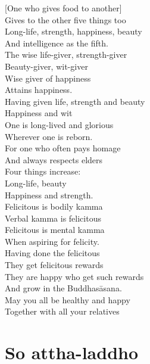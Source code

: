 \begin{english}
[One who gives food to another]\\
Gives to the other five things too\\
Long-life, strength, happiness, beauty\\
And intelligence as the fifth.\\
The wise life-giver, strength-giver\\
Beauty-giver, wit-giver\\
Wise giver of happiness\\
Attains happiness.\\
Having given life, strength and beauty\\
Happiness and wit\\
One is long-lived and glorious\\
Wherever one is reborn.\\
For one who often pays homage\\
And always respects elders\\
Four things increase:\\
Long-life, beauty\\
Happiness and strength.\\
Felicitous is bodily kamma\\
Verbal kamma is felicitous\\
Felicitous is mental kamma\\
When aspiring for felicity.\\
Having done the felicitous\\
They get felicitous rewards\\
They are happy who get such rewards\\
And grow in the Buddhasāsana.\\
May you all be healthy and happy\\
Together with all your relatives
\end{english}


\section{So attha-laddho}

\begin{twochants}
\end{twochants}

\begin{english}
\end{english}

